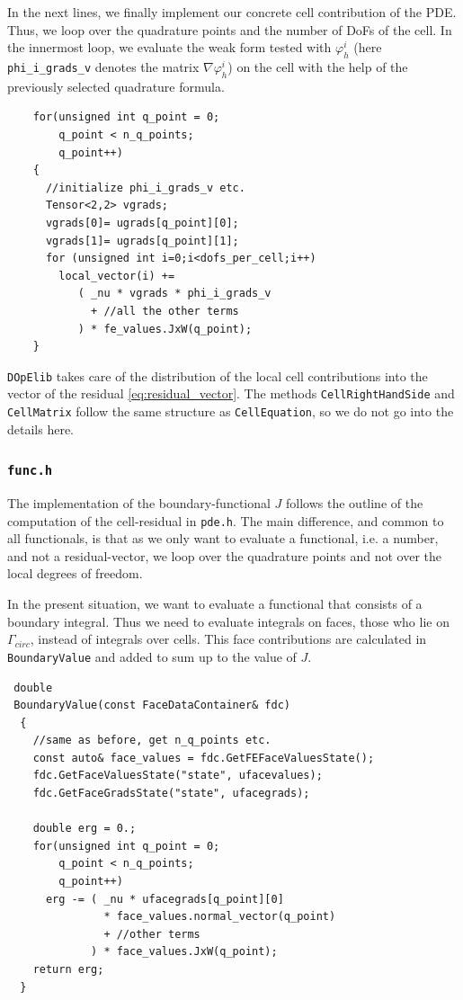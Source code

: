 \documentclass[smallextended]{svjour3}       %
\numberwithin{equation}{section}
\renewcommand{\phi}{\varphi}
\newcommand{\dope}{\texttt{DOpElib}}
\begin{document}
In the next lines, we finally implement our concrete 
cell contribution of the PDE. Thus,
we loop over the quadrature points and the number of DoFs of the cell. In the innermost loop, we evaluate the weak form tested with $\phi_{h}^i$ (here \texttt{phi\_i\_grads\_v} denotes the matrix $\nabla \phi_h^i$) 
on the cell with the help of the previously selected quadrature formula. 
 \begin{lstlisting}
    for(unsigned int q_point = 0; 
        q_point < n_q_points; 
        q_point++)
    {
      //initialize phi_i_grads_v etc.
      Tensor<2,2> vgrads;
      vgrads[0]= ugrads[q_point][0]; 
      vgrads[1]= ugrads[q_point][1];
      for (unsigned int i=0;i<dofs_per_cell;i++)
        local_vector(i) += 
           ( _nu * vgrads * phi_i_grads_v 
             + //all the other terms
           ) * fe_values.JxW(q_point);
    }
\end{lstlisting}
\dope{} takes care of the distribution of the local cell contributions into  the vector of the residual \eqref{eq:residual_vector}. The methods \texttt{CellRightHandSide} and \texttt{CellMatrix} follow the same structure as 
\texttt{CellEquation}, so we do not go into the details here.

\subsubsection{\texttt{func.h}}
The implementation of the boundary-functional $J$ follows the outline of the
computation of the cell-residual in \texttt{pde.h}. 
The main difference, and common to all functionals, is that as we only want 
to evaluate a functional, i.e. a number, and not a residual-vector, we loop over the quadrature points and not over the local 
degrees of freedom. 

In the present situation, we want to evaluate a functional 
that consists of a boundary integral. Thus we need to evaluate 
integrals on faces, those who lie on $\Gamma_{circ}$, instead of integrals over
cells. 
This face contributions are calculated in \texttt{BoundaryValue} and added to 
sum up to the value of $J$. 
\begin{lstlisting}
 double
 BoundaryValue(const FaceDataContainer& fdc)
  {
    //same as before, get n_q_points etc.
    const auto& face_values = fdc.GetFEFaceValuesState();
    fdc.GetFaceValuesState("state", ufacevalues);
    fdc.GetFaceGradsState("state", ufacegrads);
    
    double erg = 0.;
    for(unsigned int q_point = 0; 
        q_point < n_q_points; 
        q_point++)
      erg -= ( _nu * ufacegrads[q_point][0]
               * face_values.normal_vector(q_point)
               + //other terms        
             ) * face_values.JxW(q_point);
    return erg;
  }
\end{lstlisting}
\end{document}
